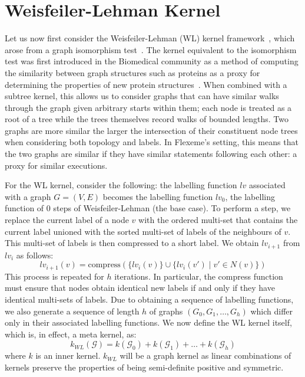 \section{Weisfeiler-Lehman Kernel}
\label{appendix:graph_kernels:wl}

Let us now first consider the Weisfeiler-Lehman (WL) kernel
framework~\cite{shervashidze2011weisfeiler}, which arose from a graph
isomorphism test~\cite{Weisfeiler1968ReductionOA}. The kernel equivalent to the
isomorphism test was first introduced in the Biomedical community as a method of
computing the similarity between graph structures such as proteins as a proxy
for determining the properties of new protein
structures~\cite{Sugiyama2018Bioinfo}. When combined with a subtree kernel, this
allows us to consider graphs that can have similar walks through the graph given
arbitrary starts within them; each node is treated as a root of a tree while the
trees themselves record walks of bounded lengths.   Two graphs are more similar
the larger the intersection of their constituent node trees when considering
both topology and labels. In Flexeme's setting, this means that the two graphs
are similar if they have similar statements following each other: a proxy for
similar executions.

For the WL kernel, consider the following: the labelling
function $lv$ associated with a graph $G=(V,E)$ becomes the labelling function
$lv_0$, the labelling function of 0 steps of Weisfeiler-Lehman (the base case).
To perform a step, we replace the current label of a node $v$ with the ordered
multi-set that contains the current label unioned with the sorted multi-set of
labels of the neighbours of $v$. This multi-set of labels is then compressed to
a short label. We obtain $lv_{i+1}$ from $lv_i$ as follows: 
\begin{equation}
    lv_{i+1}(v) = \text{compress}(\{lv_i(v)\} \cup \{lv_i(v') \mid v' \in N(v)\})
\end{equation}
%
This process is repeated for $h$ iterations. In particular, the compress
function must ensure that nodes obtain identical new labels if and only if they
have identical multi-sets of labels. Due to obtaining a sequence of labelling
functions, we also generate a sequence of length $h$ of graphs $(G_0, G_1,
\ldots, G_h)$ which differ only in their associated labelling functions. We now
define the WL kernel itself, which is, in effect, a meta kernel, as:
\begin{equation}
    k_{WL}(\mathcal{G}) = k(\mathcal{G}_0) + k(\mathcal{G}_1) + \ldots + k(\mathcal{G}_h) 
\end{equation}
%
where $k$ is an inner kernel. $k_{WL}$ will be a graph kernel as linear
combinations of kernels preserve the properties of being semi-definite positive
and symmetric.

